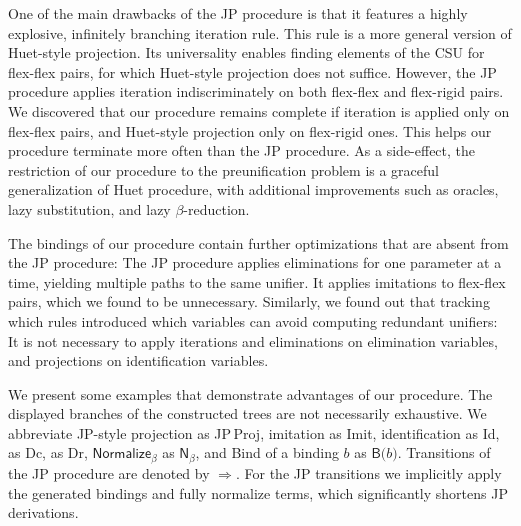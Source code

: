 One of the main drawbacks of the JP procedure is that it features a highly
explosive, infinitely branching iteration rule. This rule is a more general
version of Huet-style projection. Its universality enables finding elements of
the CSU for flex-flex pairs, for which Huet-style projection does not suffice.
However, the JP procedure applies iteration indiscriminately on both flex-flex and
flex-rigid pairs. We discovered that our procedure remains complete if iteration
is applied only on flex-flex pairs, and Huet-style projection only on
flex-rigid ones. This helps our procedure terminate more often than the JP
procedure. As a side-effect, the restriction of our procedure to
the preunification problem is a graceful generalization of Huet procedure, with
additional improvements such as oracles, lazy substitution, and lazy
$\beta$-reduction.


The bindings of our procedure contain further optimizations that are absent from
the JP procedure: The JP procedure applies eliminations for one parameter
at a time, yielding multiple paths to the same unifier. It applies imitations to
flex-flex pairs, which we found to be unnecessary. Similarly, we found out that
tracking which rules introduced which variables can avoid computing redundant
unifiers: It is not necessary to apply iterations and eliminations on
elimination variables, and projections on identification variables.

We present some examples that demonstrate advantages of our procedure.
The displayed branches of the constructed trees are not necessarily exhaustive.
We abbreviate 
JP-style projection as \textsf{JP\,Proj},
imitation as \textsf{Imit},
identification as \textsf{Id},
 as \textsf{Dc}, 
 as \textsf{Dr},
$\textsf{Normalize}_\beta$ as $\textsf{N}_\beta$,
and
\textsf{Bind} of a binding $b$ as $\textsf{B(}b\textsf{)}$.
Transitions of the JP procedure are denoted by $\Longrightarrow$.
For the JP transitions we implicitly apply the generated bindings and fully
normalize terms, which significantly shortens JP derivations.


